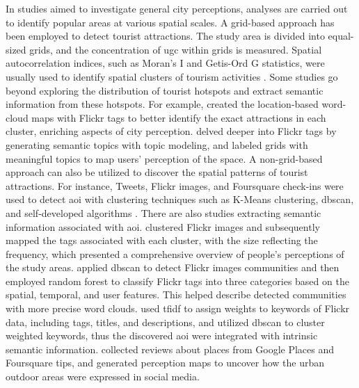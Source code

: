 \documentclass{article}
\begin{document}
In studies aimed to investigate general city perceptions, analyses are carried out to identify popular areas at various spatial scales. A grid-based approach has been employed to detect tourist attractions. The study area is divided into equal-sized grids, and the concentration of \acrshort{ugc} within grids is measured. Spatial autocorrelation indices, such as Moran's I and Getis-Ord G statistics, were usually used to identify spatial clusters of tourism activities \citep{garcia-palomares_identification_2015, kim_coastal_2021}. Some studies go beyond exploring the distribution of tourist hotspots and extract semantic information from these hotspots. For example, \cite{li_analyzing_2018} created the location-based word-cloud maps with Flickr tags to better identify the exact attractions in each cluster, enriching aspects of city perception. \cite{bahrehdar_description_2018} delved deeper into Flickr tags by generating semantic topics with topic modeling, and labeled grids with meaningful topics to map users' perception of the space. A non-grid-based approach can also be utilized to discover the spatial patterns of tourist attractions. For instance, Tweets, Flickr images, and Foursquare check-ins were used to detect \acrfull{aoi} with clustering techniques such as K-Means clustering, \acrfull{dbscan}, and self-developed algorithms \citep{hu_extracting_2015, hasnat_identifying_2018, cranshaw_livehoods_2021}. There are also studies extracting semantic information associated with \acrshort{aoi}. \cite{dunkel_visualizing_2015} clustered Flickr images and subsequently mapped the tags associated with each cluster, with the size reflecting the frequency, which presented a comprehensive overview of people's perceptions of the study areas. \cite{zhou_detecting_2015} applied \acrshort{dbscan} to detect Flickr images communities and then employed random forest to classify Flickr tags into three categories based on the spatial, temporal, and user features. This helped describe detected communities with more precise word clouds. \cite{jailani_machine_2021} used \acrfull{tfidf} to assign weights to keywords of Flickr data, including tags, titles, and descriptions, and utilized \acrshort{dbscan} to cluster weighted keywords, thus the discovered \acrshort{aoi} were integrated with intrinsic semantic information. \cite{santos_uncovering_2018} collected reviews about places from Google Places and Foursquare tips, and generated perception maps to uncover how the urban outdoor areas were expressed in social media.
\end{document}
